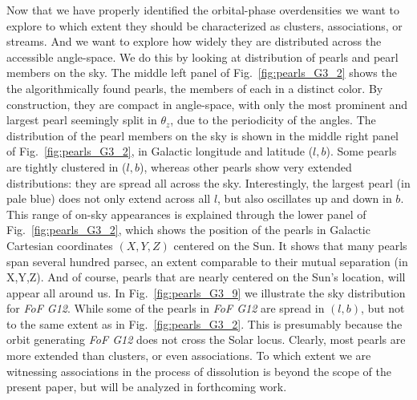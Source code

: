 \documentclass[twocolumn]{aastex631}
\begin{document}
Now that we have properly identified the orbital-phase overdensities we want to explore to which extent they should be characterized as clusters, associations, or streams. And we want to explore how widely they are distributed across the accessible angle-space. We do this by looking at distribution of pearls and pearl members on the sky. The middle left panel of Fig.~\ref{fig:pearls_G3_2} shows the the algorithmically found pearls, the members of each in a distinct color. By construction, they are compact in angle-space, with only the most prominent and largest pearl seemingly split in $\theta_{z}$, due to the periodicity of the angles. The distribution of the pearl members on the sky is shown in the middle right panel of Fig.~\ref{fig:pearls_G3_2}, in Galactic longitude and latitude ($l,b$). Some pearls are tightly clustered in ($l,b$), whereas other pearls show very extended distributions: they are spread all across the sky. Interestingly, the largest pearl (in pale blue) does not only extend across all $l$, but also oscillates up and down in $b$. This range of on-sky appearances is explained through the lower panel of Fig.~\ref{fig:pearls_G3_2}, which shows the position of the pearls in Galactic Cartesian coordinates $(X,Y,Z)$ centered on the Sun. It shows that many pearls span several hundred parsec, an extent comparable to their mutual separation (in X,Y,Z). And of course, pearls that are nearly centered on the Sun's location, will appear all around us. In Fig.~\ref{fig:pearls_G3_9} we illustrate the sky distribution for \textit{FoF G12}. While some of the pearls in \textit{FoF G12} are spread in $(l,b)$, but not to the same extent as in Fig.~\ref{fig:pearls_G3_2}. 
This is presumably because the orbit generating \textit{FoF G12} does not cross the Solar locus.
Clearly, most pearls are more extended than clusters, or even associations. To which extent we are witnessing associations in the process of dissolution is beyond the scope of the present paper, but will be analyzed in forthcoming work. 
\end{document}
